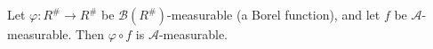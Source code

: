 Let $\varphi : R^{\#} \to R^{\#}$ be $\mathcal{B}(R^{\#})$-measurable (a Borel function), and let $f$ be $\mathcal{A}$-measurable. Then $\varphi \circ f$ is $\mathcal{A}$-measurable.
